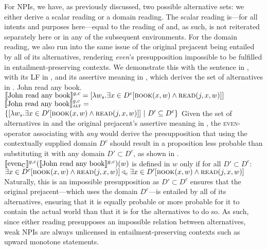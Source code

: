 For NPIs, we have, as previously discussed, two possible alternative sets: we either derive a scalar reading or a domain reading. The scalar reading is---for all intents and purposes here---equal to the reading of  and, as such, is not reiterated separately here or in any of the subsequent environments. For the domain reading, we also run into the same issue of the original prejacent being entailed by all of its alternatives, rendering \textit{even}'s presupposition impossible to be fulfilled in entailment-preserving contexts. We demonstrate this with the sentence in , with its LF in , and its assertive meaning in , which derives the set of alternatives in .
\pex[nopreamble=true]%
\a{}\ljudge{\#} John read any book.
\a[]\phantomsection [even\textsubscript{C} [John read any book]
\a{} $\intension[g,c]{John read any book}=[\lambda{w_s}.\exists{x\in{D^c}}[\predicate{book}(x,w)\land\predicate{read}(j,x,w)]]$
\a{} $\intension[g,c]{John read any book}_{\text{\scshape alt}}=$\\\emptyfill$\{[\lambda{w_s}.\exists{x\in{D'}}[\predicate{book}(x,w)\land\predicate{read}(j,x,w)]]~|~D'\subseteq D^c\}$
\xe
Given the set of alternatives in  and the original prejacent's assertive meaning in , the {\scshape even}-operator associating with \textit{any} would derive the presupposition that using the contextually supplied domain $D^c$ should result in a proposition less probable than substituting it with any domain $D'\subset D^c$, as shown in .
\ex{}
$\intension[g,c]{even\textsubscript{C}}(\intension[g,c]{John read any book})(w)$ is defined in $w$ only if for all $D'\subset D^c$:\\$\exists{x\in D^c}[\predicate{book}(x,w)\land\predicate{read}(j,x,w)]\lprob_c\exists{x\in D'}[\predicate{book}(x,w)\land\predicate{read}(j,x,w)]$
\xe
Naturally, this is an impossible presupposition as $D'\subset D^c$ ensures that the original prejacent---which uses the domain $D^c$---is entailed by all of its alternatives, ensuring that it is equally probable or more probable for it to contain the actual world than that it is for the alternatives to do so. As such, since either reading presupposes an impossible relation between alternatives, weak NPIs are always unlicensed in entailment-preserving contexts such as upward monotone statements.

